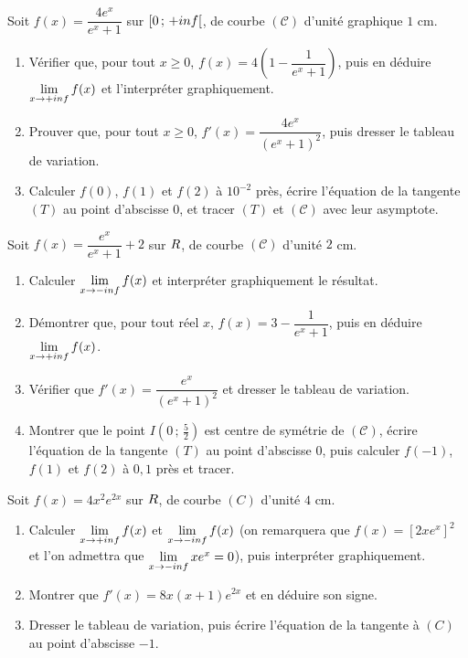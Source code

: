 \begin{annales}
Soit $f(x) = \dfrac{4e^{x}}{e^{x}+1}$ sur $\left[0\,;\,+inf\right[$, de
courbe $(\mathscr C)$ d'unité graphique $1$ cm.
\begin{enumerate}[label=\textbf{\alph*)}, leftmargin=*, itemsep=0.15em]
  \item Vérifier que, pour tout $x \geq 0$,
        $f(x) = 4\left(1-\dfrac{1}{e^{x}+1}\right)$, puis en déduire
        $\limpinf f(x)$ et l'interpréter graphiquement.
  \item Prouver que, pour tout $x \geq 0$,
        $f'(x) = \dfrac{4e^{x}}{\left(e^{x}+1\right)^{2}}$, puis dresser le
        tableau de variation.
  \item Calculer $f(0)$, $f(1)$ et $f(2)$ à $10^{-2}$ près, écrire
        l'équation de la tangente $(T)$ au point d'abscisse $0$, et tracer
        $(T)$ et $(\mathscr C)$ avec leur asymptote.
\end{enumerate}

Soit $f(x) = \dfrac{e^{x}}{e^{x}+1}+2$ sur $R$, de courbe $(\mathscr C)$
d'unité $2$ cm.
\begin{enumerate}[label=\textbf{\alph*)}, leftmargin=*, itemsep=0.15em]
  \item Calculer $\limminf f(x)$ et interpréter graphiquement le résultat.
  \item Démontrer que, pour tout réel $x$,
        $f(x) = 3-\dfrac{1}{e^{x}+1}$, puis en déduire $\limpinf f(x)$.
  \item Vérifier que $f'(x) = \dfrac{e^{x}}{\left(e^{x}+1\right)^{2}}$ et
        dresser le tableau de variation.
  \item Montrer que le point $I\left(0\,;\,\frac52\right)$ est centre de
        symétrie de $(\mathscr C)$, écrire l'équation de la tangente $(T)$ au
        point d'abscisse $0$, puis calculer $f(-1)$, $f(1)$ et $f(2)$ à
        $0{,}1$ près et tracer.
\end{enumerate}

Soit $f(x) = 4x^{2}e^{2x}$ sur $R$, de courbe $(C)$ d'unité $4$ cm.
\begin{enumerate}[label=\textbf{\alph*)}, leftmargin=*, itemsep=0.15em]
  \item Calculer $\limpinf f(x)$ et $\limminf f(x)$ (on remarquera que
        $f(x) = \left[2xe^{x}\right]^{2}$ et l'on admettra que
        $\limminf xe^{x} = 0$), puis interpréter graphiquement.
  \item Montrer que $f'(x) = 8x(x+1)e^{2x}$ et en déduire son signe.
  \item Dresser le tableau de variation, puis écrire l'équation de la
        tangente à $(C)$ au point d'abscisse $-1$.
\end{enumerate}


\end{annales}
